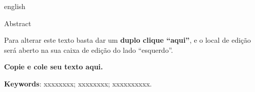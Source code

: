 
\begin{otherlanguage*}{english}
    \begin{center}{\ABNTEXchapterfont\huge Abstract}\end{center}
Para alterar este texto basta dar um 
\textbf{duplo clique “aqui”}, e o local de edição será aberto na sua caixa de edição do lado “esquerdo”.

\textbf{Copie e cole seu texto aqui.}


    \vspace{\onelineskip}
    \noindent\textbf{Keywords}: xxxxxxxx; xxxxxxxx; xxxxxxxxxx.

\end{otherlanguage*}